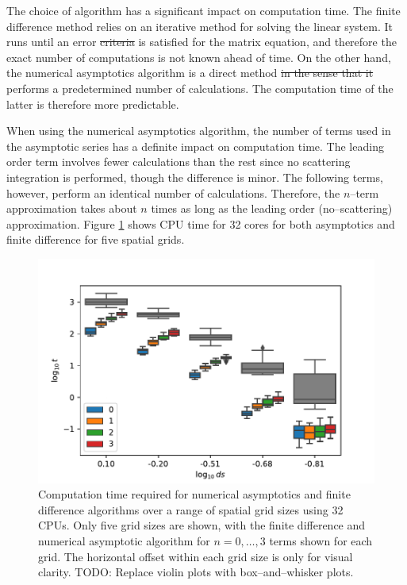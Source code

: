 \documentclass[ms,cpyr,lof,lot]{uathesis}
\providecommand{\DIFadd}[1]{{\protect\color{blue}\uwave{#1}}} %
\providecommand{\DIFdel}[1]{{\protect\color{red}\sout{#1}}}                      %
\providecommand{\DIFaddbegin}{} %
\providecommand{\DIFaddend}{} %
\providecommand{\DIFdelbegin}{} %
\providecommand{\DIFdelend}{} %
\newcommand{\DIFscaledelfig}{0.5}
\newlength{\DIFdelgraphicswidth} %
\newlength{\DIFdelgraphicsheight} %
\newcommand{\DIFaddincludegraphics}[2][]{{\color{blue}\fbox{\DIFOincludegraphics[#1]{#2}}}} %
\newcommand{\DIFdelincludegraphics}[2][]{%
\sbox{\DIFdelgraphicsbox}{\DIFOincludegraphics[#1]{#2}}%
\settoboxwidth{\DIFdelgraphicswidth}{\DIFdelgraphicsbox} %
\settoboxtotalheight{\DIFdelgraphicsheight}{\DIFdelgraphicsbox} %
\scalebox{\DIFscaledelfig}{%
\parbox[b]{\DIFdelgraphicswidth}{\usebox{\DIFdelgraphicsbox}\\[-\baselineskip] \rule{\DIFdelgraphicswidth}{0em}}\llap{\resizebox{\DIFdelgraphicswidth}{\DIFdelgraphicsheight}{%
\setlength{\unitlength}{\DIFdelgraphicswidth}%
\begin{picture}(1,1)%
\thicklines\linethickness{2pt} %
{\color[rgb]{1,0,0}\put(0,0){\framebox(1,1){}}}%
{\color[rgb]{1,0,0}\put(0,0){\line( 1,1){1}}}%
{\color[rgb]{1,0,0}\put(0,1){\line(1,-1){1}}}%
\end{picture}%
}\hspace*{3pt}}} %
} %
\DeclareRobustCommand{\DIFaddbegin}{\DIFOaddbegin \let\includegraphics\DIFaddincludegraphics} %
\DeclareRobustCommand{\DIFaddend}{\DIFOaddend \let\includegraphics\DIFOincludegraphics} %
\DeclareRobustCommand{\DIFdelbegin}{\DIFOdelbegin \let\includegraphics\DIFdelincludegraphics} %
\DeclareRobustCommand{\DIFdelend}{\DIFOaddend \let\includegraphics\DIFOincludegraphics} %
\begin{document}
The choice of algorithm has a significant impact on computation time.
The finite difference method relies on an iterative method for solving the linear system.
It runs until an error \DIFdelbegin \DIFdel{criteria }\DIFdelend \DIFaddbegin \DIFadd{criterion }\DIFaddend is satisfied for the matrix equation, and therefore the exact number of computations is not known ahead of time.
On the other hand, the numerical asymptotics algorithm is a direct method \DIFdelbegin \DIFdel{in the sense that it }\DIFdelend \DIFaddbegin \DIFadd{that }\DIFaddend performs a predetermined number of calculations.
The computation time of the latter is therefore more predictable.

When using the numerical asymptotics algorithm, the number of terms used in the asymptotic series has a definite impact on computation time.
The leading order term involves fewer calculations than the rest since no scattering integration is performed, though the difference is minor.
The following terms, however, perform an identical number of calculations.
Therefore, the $n$--term approximation takes about $n$ times as long as the leading order (no--scattering) approximation.
Figure \ref{fig:compute_time_violin} shows CPU time for 32 cores for both asymptotics and finite difference for five spatial grids.

\begin{figure}[h]
  \centering
  \includegraphics[width=5in]{compute_time_violin}
  \caption{Computation time required for numerical asymptotics and finite difference algorithms over a range of spatial grid sizes using 32 CPUs. Only five grid sizes are shown, with the finite difference and numerical asymptotic algorithm for $n=0,\ldots,3$ terms shown for each grid. The horizontal offset within each grid size is only for visual clarity. TODO: Replace violin plots with box--and--whisker plots.}
  \label{fig:compute_time_violin}
\end{figure}
\end{document}
